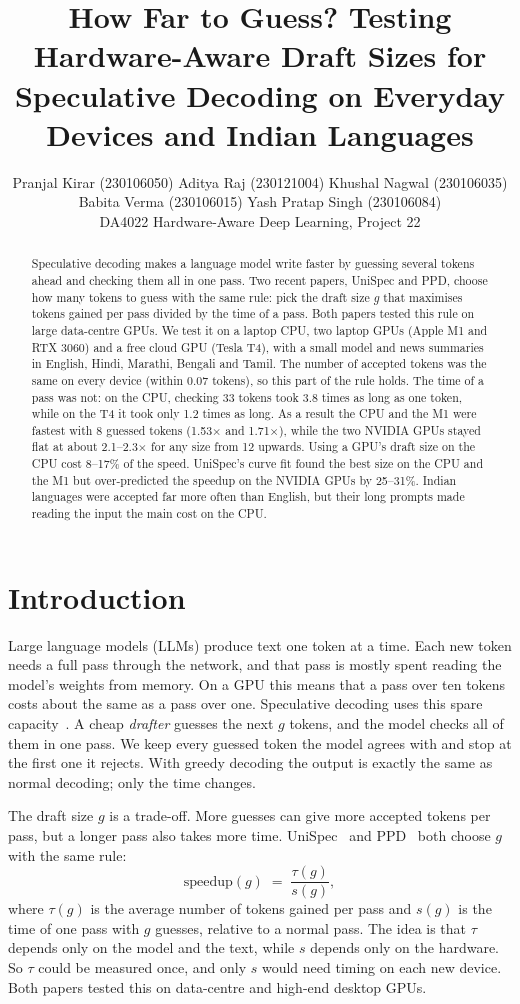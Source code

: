 \documentclass{article}
\title{How Far to Guess? Testing Hardware-Aware Draft Sizes for Speculative Decoding on Everyday Devices and Indian Languages}
\author{%
  Pranjal Kirar (230106050) \And Aditya Raj (230121004) \And Khushal Nagwal (230106035) \AND
  Babita Verma (230106015) \And Yash Pratap Singh (230106084) \\[4pt]
  DA4022 Hardware-Aware Deep Learning, Project 22
}
\newcommand{\tms}{\ensuremath{\times}}
\begin{document}
\maketitle

\begin{abstract}
Speculative decoding makes a language model write faster by guessing several tokens ahead and checking them all in one pass.
Two recent papers, UniSpec and PPD, choose how many tokens to guess with the same rule: pick the draft size $g$ that maximises tokens gained per pass divided by the time of a pass.
Both papers tested this rule on large data-centre GPUs.
We test it on a laptop CPU, two laptop GPUs (Apple M1 and RTX 3060) and a free cloud GPU (Tesla T4), with a small model and news summaries in English, Hindi, Marathi, Bengali and Tamil.
The number of accepted tokens was the same on every device (within 0.07 tokens), so this part of the rule holds.
The time of a pass was not: on the CPU, checking 33 tokens took 3.8 times as long as one token, while on the T4 it took only 1.2 times as long.
As a result the CPU and the M1 were fastest with 8 guessed tokens (1.53\tms{} and 1.71\tms{}), while the two NVIDIA GPUs stayed flat at about 2.1--2.3\tms{} for any size from 12 upwards.
Using a GPU's draft size on the CPU cost 8--17\% of the speed.
UniSpec's curve fit found the best size on the CPU and the M1 but over-predicted the speedup on the NVIDIA GPUs by 25--31\%.
Indian languages were accepted far more often than English, but their long prompts made reading the input the main cost on the CPU.
\end{abstract}

\section{Introduction}

Large language models (LLMs) produce text one token at a time.
Each new token needs a full pass through the network, and that pass is mostly spent reading the model's weights from memory.
On a GPU this means that a pass over ten tokens costs about the same as a pass over one.
Speculative decoding uses this spare capacity~\citep{leviathan, chen}.
A cheap \emph{drafter} guesses the next $g$ tokens, and the model checks all of them in one pass.
We keep every guessed token the model agrees with and stop at the first one it rejects.
With greedy decoding the output is exactly the same as normal decoding; only the time changes.

The draft size $g$ is a trade-off.
More guesses can give more accepted tokens per pass, but a longer pass also takes more time.
UniSpec~\citep{unispec} and PPD~\citep{ppd} both choose $g$ with the same rule:
\begin{equation}
  \text{speedup}(g) \;=\; \frac{\tau(g)}{s(g)},
  \label{eq:rule}
\end{equation}
where $\tau(g)$ is the average number of tokens gained per pass and $s(g)$ is the time of one pass with $g$ guesses, relative to a normal pass.
The idea is that $\tau$ depends only on the model and the text, while $s$ depends only on the hardware.
So $\tau$ could be measured once, and only $s$ would need timing on each new device.
Both papers tested this on data-centre and high-end desktop GPUs.
\end{document}
